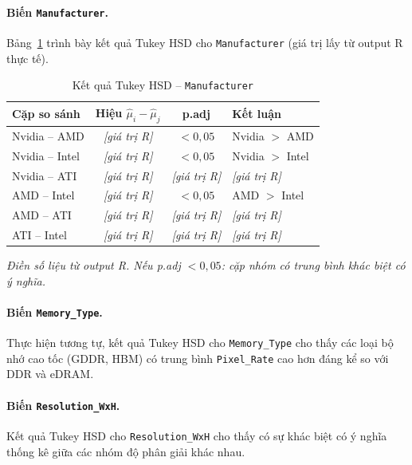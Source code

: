 \paragraph{Biến \texttt{Manufacturer}.}

Bảng~\ref{tab:tukey_manufacturer} trình bày kết quả Tukey HSD cho
\texttt{Manufacturer} (giá trị lấy từ output R thực tế).

\begin{table}[H]
  \centering
  \caption{Kết quả Tukey HSD -- \texttt{Manufacturer}}
  \label{tab:tukey_manufacturer}
  \begin{tabular}{lccl}
    \toprule
    \textbf{Cặp so sánh} & \textbf{Hiệu $\hat\mu_i - \hat\mu_j$} &
    \textbf{p.adj} & \textbf{Kết luận} \\
    \midrule
    Nvidia -- AMD   & \textit{[giá trị R]} & $<0{,}05$ & Nvidia $>$ AMD \\
    Nvidia -- Intel & \textit{[giá trị R]} & $<0{,}05$ & Nvidia $>$ Intel \\
    Nvidia -- ATI   & \textit{[giá trị R]} & \textit{[giá trị R]} & \textit{[giá trị R]} \\
    AMD -- Intel    & \textit{[giá trị R]} & $<0{,}05$ & AMD $>$ Intel \\
    AMD -- ATI      & \textit{[giá trị R]} & \textit{[giá trị R]} & \textit{[giá trị R]} \\
    ATI -- Intel    & \textit{[giá trị R]} & \textit{[giá trị R]} & \textit{[giá trị R]} \\
    \bottomrule
  \end{tabular}
  \par\smallskip
  \footnotesize\textit{Điền số liệu từ output R. Nếu p.adj $< 0{,}05$: cặp nhóm có trung bình khác biệt có ý nghĩa.}
\end{table}

\paragraph{Biến \texttt{Memory\_Type}.}
Thực hiện tương tự, kết quả Tukey HSD cho \texttt{Memory\_Type} cho thấy các loại
bộ nhớ cao tốc (GDDR, HBM) có trung bình \texttt{Pixel\_Rate} cao hơn đáng kể so
với DDR và eDRAM.

\paragraph{Biến \texttt{Resolution\_WxH}.}
Kết quả Tukey HSD cho \texttt{Resolution\_WxH} cho thấy có sự khác biệt có ý nghĩa
thống kê giữa các nhóm độ phân giải khác nhau.

